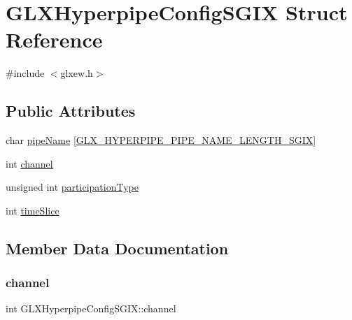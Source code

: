 \hypertarget{struct_g_l_x_hyperpipe_config_s_g_i_x}{}\section{G\+L\+X\+Hyperpipe\+Config\+S\+G\+IX Struct Reference}
\label{struct_g_l_x_hyperpipe_config_s_g_i_x}


{\ttfamily \#include $<$glxew.\+h$>$}

\subsection*{Public Attributes}
\begin{DoxyCompactItemize}
\item 
char \mbox{\hyperlink{struct_g_l_x_hyperpipe_config_s_g_i_x_a9e3748f92005cac81cb44d4c67acccb8}{pipe\+Name}} \mbox{[}\mbox{\hyperlink{glxew_8h_ae1c8261c0861010d8003a31d07e26005}{G\+L\+X\+\_\+\+H\+Y\+P\+E\+R\+P\+I\+P\+E\+\_\+\+P\+I\+P\+E\+\_\+\+N\+A\+M\+E\+\_\+\+L\+E\+N\+G\+T\+H\+\_\+\+S\+G\+IX}}\mbox{]}
\item 
int \mbox{\hyperlink{struct_g_l_x_hyperpipe_config_s_g_i_x_abc812d8796ba89d5de4e33b3532d8335}{channel}}
\item 
unsigned int \mbox{\hyperlink{struct_g_l_x_hyperpipe_config_s_g_i_x_a093cfaaec305531f66e1120929b5b01b}{participation\+Type}}
\item 
int \mbox{\hyperlink{struct_g_l_x_hyperpipe_config_s_g_i_x_afe9288e75dc1ae5e0f33eff978d7024d}{time\+Slice}}
\end{DoxyCompactItemize}


\subsection{Member Data Documentation}
\mbox{\label{struct_g_l_x_hyperpipe_config_s_g_i_x_abc812d8796ba89d5de4e33b3532d8335}} 
\subsubsection{\texorpdfstring{channel}{channel}}
{\footnotesize\ttfamily int G\+L\+X\+Hyperpipe\+Config\+S\+G\+I\+X\+::channel}

